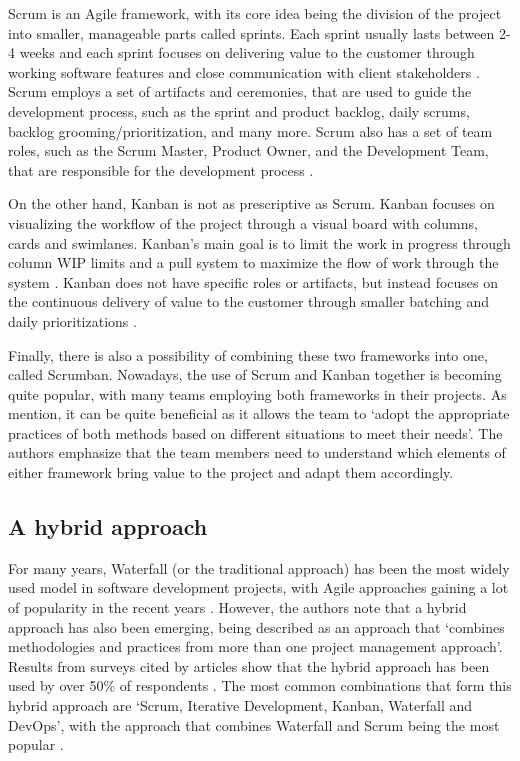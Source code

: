Scrum is an Agile framework, with its core idea being the division of the project into smaller, manageable parts called sprints. Each sprint usually lasts between 2-4 weeks and each sprint focuses on delivering value to the customer through working software features and close communication with client stakeholders \parencite{scrumban, agile}. Scrum employs a set of artifacts and ceremonies, that are used to guide the development process, such as the sprint and product backlog, daily scrums, backlog grooming/prioritization, and many more. Scrum also has a set of team roles, such as the Scrum Master, Product Owner, and the Development Team, that are responsible for the development process \parencite{scrumban}. 

On the other hand, Kanban is not as prescriptive as Scrum. Kanban focuses on visualizing the workflow of the project through a visual board with columns, cards and swimlanes. Kanban's main goal is to limit the work in progress through column WIP limits and a pull system to maximize the flow of work through the system \parencite{agile}. Kanban does not have specific roles or artifacts, but instead focuses on the continuous delivery of value to the customer through smaller batching and daily prioritizations \parencite{scrumban}.

Finally, there is also a possibility of combining these two frameworks into one, called Scrumban. Nowadays, the use of Scrum and Kanban together is becoming quite popular, with many teams employing both frameworks in their projects. As \textcite{scrumban} mention, it can be quite beneficial as it allows the team to `adopt the appropriate practices of both methods based on different situations to meet their needs'. The authors emphasize that the team members need to understand which elements of either framework bring value to the project and adapt them accordingly.

\subsection{A hybrid approach}

For many years, Waterfall (or the traditional approach) has been the most widely used model in software development projects, with Agile approaches gaining a lot of popularity in the recent years \parencite{hybrid1}. However, the authors note that a hybrid approach has also been emerging, being described as an approach that `combines methodologies and practices from more than one project management approach'. Results from surveys cited by articles show that the hybrid approach has been used by over 50\% of respondents \parencite{hybrid1,hybrid2}. The most common combinations that form this hybrid approach are `Scrum, Iterative Development, Kanban, Waterfall and DevOps', with the approach that combines Waterfall and Scrum being the most popular \parencite{hybrid2}.

